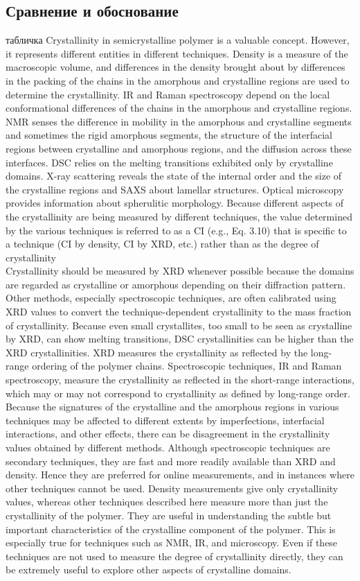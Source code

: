 \subsection{Сравнение и обоснование}
табличка
Crystallinity in semicrystalline polymer is a valuable concept. However, it represents
different entities in different techniques. Density is a measure of the macroscopic
volume, and differences in the density brought about by differences in the
packing of the chains in the amorphous and crystalline regions are used to determine
the crystallinity. IR and Raman spectroscopy depend on the local conformational
differences of the chains in the amorphous and crystalline regions. NMR senses
the difference in mobility in the amorphous and crystalline segments and sometimes
the rigid amorphous segments, the structure of the interfacial regions between crystalline
and amorphous regions, and the diffusion across these interfaces. DSC relies
on the melting transitions exhibited only by crystalline domains. X-ray scattering reveals the state of the internal order and the size of the crystalline regions and
SAXS about lamellar structures. Optical microscopy provides information about
spherulitic morphology. Because different aspects of the crystallinity are being
measured by different techniques, the value determined by the various techniques
is referred to as a CI (e.g., Eq. 3.10) that is specific to a technique (CI by density,
CI by XRD, etc.) rather than as the degree of crystallinity\\
Crystallinity should
be measured by XRD whenever possible because the domains are regarded as crystalline
or amorphous depending on their diffraction pattern. Other methods, especially
spectroscopic techniques, are often calibrated using XRD values to convert
the technique-dependent crystallinity to the mass fraction of crystallinity. Because
even small crystallites, too small to be seen as crystalline by XRD, can show melting
transitions, DSC crystallinities can be higher than the XRD crystallinities. XRD
measures the crystallinity as reflected by the long-range ordering of the polymer
chains. Spectroscopic techniques, IR and Raman spectroscopy, measure the crystallinity
as reflected in the short-range interactions, which may or may not correspond
to crystallinity as defined by long-range order. Because the signatures of the crystalline
and the amorphous regions in various techniques may be affected to different
extents by imperfections, interfacial interactions, and other effects, there can be
disagreement in the crystallinity values obtained by different methods.
Although spectroscopic techniques are secondary techniques, they are fast and
more readily available than XRD and density. Hence they are preferred for online measurements,
and in instances where other techniques cannot be used. Density measurements
give only crystallinity values, whereas other techniques described here measure
more than just the crystallinity of the polymer. They are useful in understanding the
subtle but important characteristics of the crystalline component of the polymer.
This is especially true for techniques such as NMR, IR, and microscopy. Even if these
techniques are not used to measure the degree of crystallinity directly, they can be
extremely useful to explore other aspects of crystalline domains.
